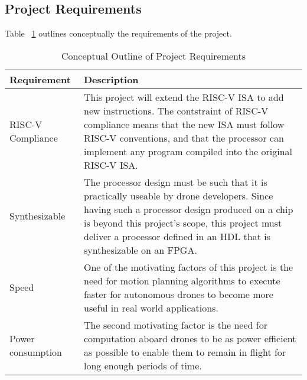 \subsection{Project Requirements} \label{subsection:projectRequirements}
Table ~\ref{table:projectRequirements} outlines conceptually the requirements of the project.

\begin{table}[H]
\begin{centering}
\begin{tabular}{| m{0.25\linewidth} | m{0.75\linewidth} |}
\hline
\textbf{Requirement}       & \textbf{Description} \\
\hline
RISC-V Compliance   & This project will extend the RISC-V \ac{ISA} to add new instructions. The contstraint of RISC-V compliance means that the new ISA must follow RISC-V conventions, and that the processor can implement any program compiled into the original RISC-V ISA.\\
\hline
Synthesizable       & The processor design must be such that it is practically useable by drone developers. Since having such a processor design produced on a chip is beyond this project's scope, this project must deliver a processor defined in an \ac{HDL} that is synthesizable on an FPGA.\\
\hline
Speed               & One of the motivating factors of this project is the need for motion planning algorithms to execute faster for autonomous drones to become more useful in real world applications. \\
\hline
Power consumption   & The second motivating factor is the need for computation aboard drones to be as power efficient as possible to enable them to remain in flight for long enough periods of time.\\
\hline
\end{tabular}
\caption{Conceptual Outline of Project Requirements}
\label{table:projectRequirements}
\end{centering}
\end{table}